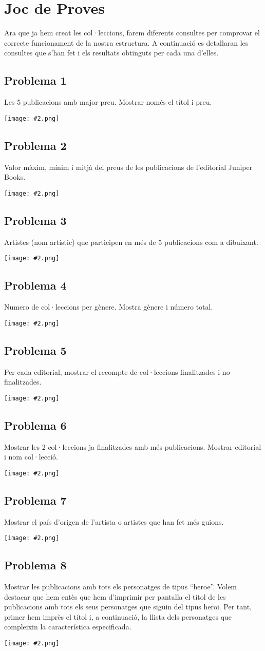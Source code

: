 \documentclass{article}
\newcommand{\imatge}[2]{
\begin{center}
    \texttt{[image: \#2.png]}
\end{center}
}
\begin{document}
\section{Joc de Proves}
Ara que ja hem creat les col·leccions, farem diferents consultes per comprovar el correcte funcionament de la nostra estructura. A continuaci\'o es detallaran les consultes que s'han fet i els resultats obtinguts per cada una d'elles.
\subsection*{Problema 1}
Les 5 publicacions amb major preu. Mostrar només el títol i preu.
\imatge{1}{1}
\subsection*{Problema 2}
Valor màxim, mínim i mitjà del preus de les publicacions de l’editorial Juniper Books.
\imatge{1}{2}
\subsection*{Problema 3}
Artistes (nom artístic) que participen en més de 5 publicacions com a dibuixant.
\imatge{1}{3}
\subsection*{Problema 4}
Numero de col·leccions per gènere. Mostra gènere i número total.
\imatge{1}{4}
\subsection*{Problema 5}
Per cada editorial, mostrar el recompte de col·leccions finalitzades i no finalitzades.
\imatge{1}{5}
\subsection*{Problema 6}
Mostrar les 2 col·leccions ja finalitzades amb més publicacions. Mostrar editorial i nom col·lecció.
\imatge{1}{6}
\subsection*{Problema 7}
Mostrar el país d’origen de l’artista o artistes que han fet més guions.
\imatge{1}{7}
\subsection*{Problema 8}
Mostrar les publicacions amb tots els personatges de tipus “heroe”. Volem destacar que hem entès que hem d'imprimir per pantalla el títol de les publicacions amb tots els seus personatges que siguin del tipus heroi. Per tant, primer hem imprès el títol i, a continuació, la llista dels personatges que compleixin la característica especificada.
\imatge{1}{8}
\end{document}
